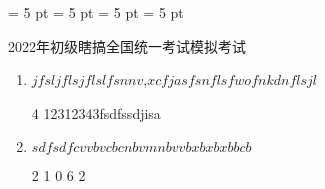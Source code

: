 \documentclass{examinations}
\begin{document}
	\abovedisplayshortskip 	= 5 pt
	\belowdisplayshortskip 	= 5 pt
	\abovedisplayskip 			= 5 pt
	\belowdisplayskip 			= 5 pt

\begin{volumeheaders}
	2022年初级瞎搞全国统一考试模拟考试
\end{volumeheaders}

\examattention{2 em}

\singlechoice

\begin{enumerate}
	\item  $jfsljflsjflslfsnnv$,$xcfjasfsnflsfwofnkdnflsjl$
		\begin{options}4
			{12312}{343}{fsdfs}{sdjisa}
		\end{options}
  \item $sdfsdfcvvbvcbcnbvmnbvvbxbxbxbbcb$
		\begin{options}2
			{1}
			{0}
			{6}
			{2}
		\end{options}
\end{enumerate}
\end{document}
